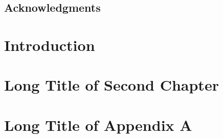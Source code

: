 \section*{Acknowledgments}



\mainmatter

\pagestyle{maintext}


%


\chapter{Introduction}
\label{ch:IntroductionLabel} 




\chapter[%
Short Title of 2nd Ch.
]{%
Long Title of Second Chapter
}%
\label{ch:2ndChapterLabel} 




\appendix

\chapter[%
Short Title of Appendix A
]{%
Long Title of Appendix A
}%
\label{ch:AppendixALabel} 




\backmatter


